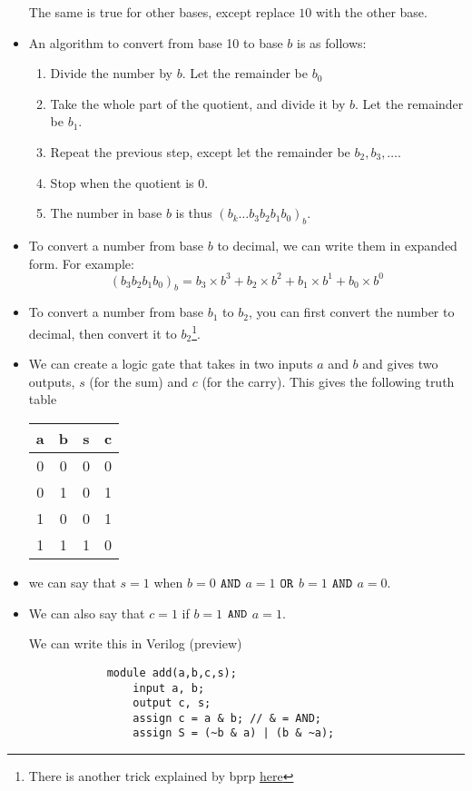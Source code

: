 \begin{itemize}
\begin{idea}
        The same is true for other bases, except replace $10$ with the other base.
    \end{idea}
    \item An algorithm to convert from base 10 to base $b$ is as follows:
    \begin{enumerate}
        \item Divide the number by $b$. Let the remainder be $b_0$
        \item Take the whole part of the quotient, and divide it by $b$. Let the remainder be $b_1$.
        \item Repeat the previous step, except let the remainder be $b_2,b_3,\dots$.
        \item Stop when the quotient is $0$.
        \item The number in base $b$ is thus $(b_k \dots b_3b_2b_1b_0)_b$.
    \end{enumerate}
    \item To convert a number from base $b$ to decimal, we can write them in expanded form. For example:
    \begin{equation}
        (b_3b_2b_1b_0)_b = b_3 \times b^3 + b_2 \times b^2 + b_1 \times b^1 + b_0 \times b^0
    \end{equation}
    \item To convert a number from base $b_1$ to $b_2$, you can first convert the number to decimal, then convert it to $b_2$\footnote{There is another trick explained by bprp \href{https://www.youtube.com/watch?v=nm6wmLD5F9s}{here}}.
    \item We can create a logic gate that takes in two inputs $a$ and $b$ and gives two outputs, $s$ (for the sum) and $c$ (for the carry). This gives the following truth table
    \begin{center}
        \begin{tabular}{|c|c|c|c|}
            \hline
            a & b & s & c \\ 
            \hline 
            0 & 0 & 0 & 0 \\ 
            0 & 1 & 0 & 1 \\ 
            1 & 0 & 0 & 1 \\ 
            1 & 1 & 1 & 0 \\ 
            \hline 
        \end{tabular}
    \end{center}
    \item we can say that $s=1$ when $b=0$ $\verb#AND#$ $a=1$ $\verb#OR#$ $b=1$ $\verb#AND#$ $a=0$.
    \item We can also say that $c=1$ if $b=1$ $\verb#AND#$ $a=1$.
    \begin{idea}
        We can write this in Verilog (preview)
        \begin{verbatim}
            module add(a,b,c,s);
                input a, b;
                output c, s;
                assign c = a & b; // & = AND;
                assign S = (~b & a) | (b & ~a);
        \end{verbatim}
    \end{idea}
\end{itemize}